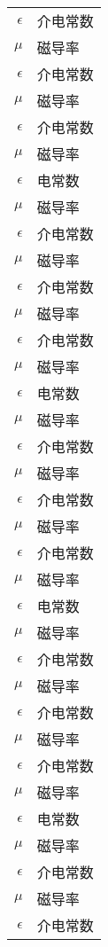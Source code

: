 
\begin{nomenclature*}
\label{chap:symb}

\begin{longtable}{rl}
  $\epsilon$    & 介电常数 \\  
  $\mu$         & 磁导率 \\
  $\epsilon$    & 介电常数 \\
  $\mu$         & 磁导率 \\
  $\epsilon$    & 介电常数 \\
  $\mu$         & 磁导率 \\
  $\epsilon$    & 电常数 \\
  $\mu$         & 磁导率 \\
  $\epsilon$    & 介电常数 \\
  $\mu$         & 磁导率 \\
  $\epsilon$    & 介电常数 \\
  $\mu$         & 磁导率 \\
  $\epsilon$    & 介电常数 \\
  $\mu$         & 磁导率 \\
  $\epsilon$    & 电常数 \\
  $\mu$         & 磁导率 \\
  $\epsilon$    & 介电常数 \\
  $\mu$         & 磁导率 \\
  $\epsilon$    & 介电常数 \\
  $\mu$         & 磁导率 \\
  $\epsilon$    & 介电常数 \\
  $\mu$         & 磁导率 \\
  $\epsilon$    & 电常数 \\
  $\mu$         & 磁导率 \\
  $\epsilon$    & 介电常数 \\
  $\mu$         & 磁导率 \\
  $\epsilon$    & 介电常数 \\
  $\mu$         & 磁导率 \\
  $\epsilon$    & 介电常数 \\
  $\mu$         & 磁导率 \\
  $\epsilon$    & 电常数 \\
  $\mu$         & 磁导率 \\
  $\epsilon$    & 介电常数 \\
  $\mu$         & 磁导率 \\
  $\epsilon$    & 介电常数 \\

\end{longtable}
\end{nomenclature*}
